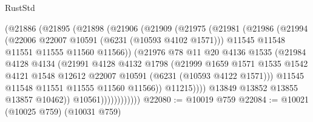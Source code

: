 \begin{lexlean}{RustStd}
\begin{coremodule}
{{                        (@21886
                          (@21895
                            (@21898
                              (@21906
                                (@21909
                                  (@21975
                                    (@21981
                                      (@21986
                                        (@21994
                                          (@22006 @22007 @10591 (@6231 (@10593 @4102 @1571)))
                                          @11545
                                          @11548
                                          @11551
                                          @11555
                                          @11560
                                          @11566))
                                      (@21976
                                        @78
                                        @11
                                        @20
                                        @4136
                                        @1535
                                        (@21984
                                          @4128
                                          @4134
                                          (@21991
                                            @4128
                                            @4132
                                            @1798
                                            (@21999
                                              @1659
                                              @1571
                                              @1535
                                              @1542
                                              @4121
                                              @1548
                                              @12612
                                              @22007
                                              @10591
                                              (@6231 (@10593 @4122 @1571)))
                                            @11545
                                            @11548
                                            @11551
                                            @11555
                                            @11560
                                            @11566))
                                        @11215))))
                                @13849
                                @13852
                                @13855
                                @13857
                                @10462))
                            @10561))))))))))))
@22080 := @10019 @759
@22084 := @10021 (@10025 @759) (@10031 @759)
}}
\end{coremodule}
\end{lexlean}
